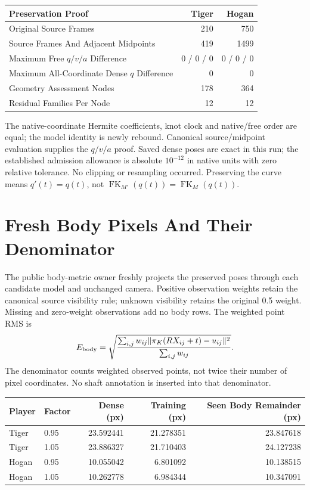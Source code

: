 \documentclass[11pt,letterpaper]{article}
\newcommand{\chapterpage}[1]{\clearpage\section{#1}}
\begin{document}
\begin{tabular}{@{}lrr@{}}\toprule
Preservation Proof & Tiger & Hogan\\\midrule
Original Source Frames & 210 & 750\\
Source Frames And Adjacent Midpoints & 419 & 1499\\
Maximum Free $q/v/a$ Difference & 0 / 0 / 0 & 0 / 0 / 0\\
Maximum All-Coordinate Dense $q$ Difference & 0 & 0\\
Geometry Assessment Nodes & 178 & 364\\
Residual Families Per Node & 12 & 12\\\bottomrule
\end{tabular}

The native-coordinate Hermite coefficients, knot clock and native/free order are equal; the model identity is newly rebound. Canonical source/midpoint evaluation supplies the $q/v/a$ proof. Saved dense poses are exact in this run; the established admission allowance is absolute $10^{-12}$ in native units with zero relative tolerance. No clipping or resampling occurred. Preserving the curve means $q'(t)=q(t)$, not $\operatorname{FK}_{M'}(q(t))=\operatorname{FK}_{M}(q(t))$.

\chapterpage{Fresh Body Pixels And Their Denominator}
The public body-metric owner freshly projects the preserved poses through each candidate model and unchanged camera. Positive observation weights retain the canonical source visibility rule; unknown visibility retains the original 0.5 weight. Missing and zero-weight observations add no body rows. The weighted point RMS is
\[
 E_{\rm body}=\sqrt{\frac{\sum_{i,j}w_{ij}\|\pi_K(RX_{ij}+t)-u_{ij}\|^2}{\sum_{i,j}w_{ij}}}.
\]
The denominator counts weighted observed points, not twice their number of pixel coordinates. No shaft annotation is inserted into that denominator.

\begin{tabular}{@{}llrrr@{}}\toprule
Player & Factor & Dense (px) & Training (px) & Seen Body Remainder (px)\\\midrule
Tiger & 0.95 & 23.592441 & 21.278351 & 23.847618\\
Tiger & 1.05 & 23.886327 & 21.710403 & 24.127238\\
Hogan & 0.95 & 10.055042 & 6.801092 & 10.138515\\
Hogan & 1.05 & 10.262778 & 6.984344 & 10.347091\\\bottomrule
\end{tabular}
\end{document}
